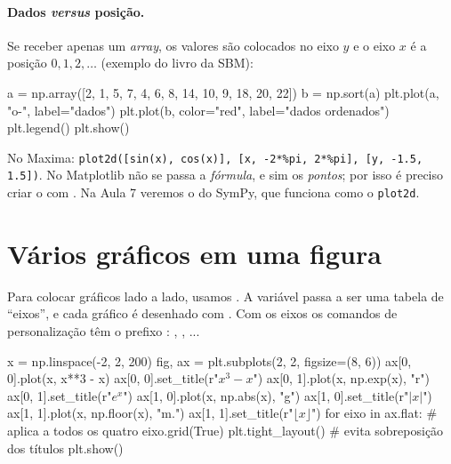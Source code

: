 \paragraph{Dados \emph{versus} posição.} Se  receber apenas um \emph{array}, os valores são colocados
no eixo $y$ e o eixo $x$ é a posição $0,1,2,\dots$ (exemplo do livro da SBM):

\begin{entrada}
a = np.array([2, 1, 5, 7, 4, 6, 8, 14, 10, 9, 18, 20, 22])
b = np.sort(a)
plt.plot(a, "o-", label="dados")
plt.plot(b, color="red", label="dados ordenados")
plt.legend()
plt.show()
\end{entrada}

\begin{maxima}
No Maxima: \texttt{plot2d([sin(x), cos(x)], [x, -2*\%pi, 2*\%pi], [y, -1.5, 1.5])}. No Matplotlib não se passa a
\emph{fórmula}, e sim os \emph{pontos}; por isso é preciso criar o  com . Na Aula 7 veremos o
 do SymPy, que funciona como o \texttt{plot2d}.
\end{maxima}

\section{Vários gráficos em uma figura}

Para colocar gráficos lado a lado, usamos . A variável  passa
a ser uma tabela de ``eixos'', e cada gráfico é desenhado com . Com os eixos os comandos de
personalização têm o prefixo : , , ...

\begin{entrada}
x = np.linspace(-2, 2, 200)
fig, ax = plt.subplots(2, 2, figsize=(8, 6))
ax[0, 0].plot(x, x**3 - x)
ax[0, 0].set_title(r"$x^3 - x$")
ax[0, 1].plot(x, np.exp(x), "r")
ax[0, 1].set_title(r"$e^x$")
ax[1, 0].plot(x, np.abs(x), "g")
ax[1, 0].set_title(r"$|x|$")
ax[1, 1].plot(x, np.floor(x), "m.")
ax[1, 1].set_title(r"$\lfloor x \rfloor$")
for eixo in ax.flat:          # aplica a todos os quatro
    eixo.grid(True)
plt.tight_layout()            # evita sobreposição dos títulos
plt.show()
\end{entrada}

